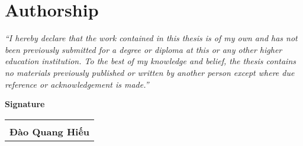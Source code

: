 \section*{Authorship}
\label{sec:authorship}

\emph{``I hereby declare that the work contained in this thesis is of my own and has not been previously submitted for a degree or diploma at this or any other higher education institution. To the best of my knowledge and belief, the thesis contains no materials previously published or written by another person except where due reference or acknowledgement is made.''} \\

\vspace{1cm}

\begin{center}
    \textbf{\large{Signature}}
    \vspace{2cm}

\begin{table}[h!]
\centering
\begin{tabularx}{0.45\linewidth}{ 
   >{\centering\arraybackslash}X 
}
\hrulefill                  \\
\textbf{Đào Quang Hiếu} 
\end{tabularx}
\end{table}
\end{center}